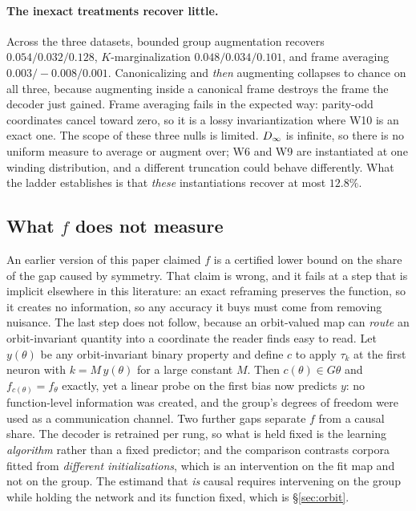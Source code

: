 \paragraph{The inexact treatments recover little.} Across the three datasets, bounded group
augmentation recovers $0.054 / 0.032 / 0.128$, $K$-marginalization $0.048 / 0.034 / 0.101$, and
frame averaging $0.003 / -0.008 / 0.001$. Canonicalizing and \emph{then} augmenting collapses to
chance on all three, because augmenting inside a canonical frame destroys the frame the decoder just
gained. Frame averaging fails in the expected way: parity-odd coordinates cancel toward zero, so it
is a lossy invariantization where W10 is an exact one. The scope of these three nulls is limited.
$D_\infty$ is infinite, so there is no uniform measure to average or augment over; W6 and W9 are
instantiated at one winding distribution, and a different truncation could behave differently. What
the ladder establishes is that \emph{these} instantiations recover at most $12.8\%$.

\subsection{What \texorpdfstring{$f$}{f} does not measure}\label{sec:bounds}

An earlier version of this paper claimed $f$ is a certified lower bound on the share of the gap
caused by symmetry. That claim is wrong, and it fails at a step that is implicit elsewhere in this
literature: an exact reframing preserves the function, so it creates no information, so any accuracy
it buys must come from removing nuisance. The last step does not follow, because an orbit-valued map
can \emph{route} an orbit-invariant quantity into a coordinate the reader finds easy to read. Let
$y(\theta)$ be any orbit-invariant binary property and define $c$ to apply $\tau_k$ at the first
neuron with $k = M\,y(\theta)$ for a large constant $M$. Then $c(\theta) \in G\theta$ and
$f_{c(\theta)} = f_\theta$ exactly, yet a linear probe on the first bias now predicts $y$: no
function-level information was created, and the group's degrees of freedom were used as a
communication channel. Two further gaps separate $f$ from a causal share. The decoder is retrained
per rung, so what is held fixed is the learning \emph{algorithm} rather than a fixed predictor; and
the comparison contrasts corpora fitted from \emph{different initializations}, which is an
intervention on the fit map and not on the group. The estimand that \emph{is} causal requires
intervening on the group while holding the network and its function fixed, which is
\S\ref{sec:orbit}.
